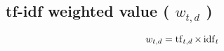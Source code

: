 \subsection{tf-idf weighted value ( $w_{t,d}$ ) \cite{nlp-1}}\label{tf-idf weighted value}
\[
    w_{t,d} = \operatorname{tf}_{t,d} \times\operatorname{idf}_t
\]











































































































































